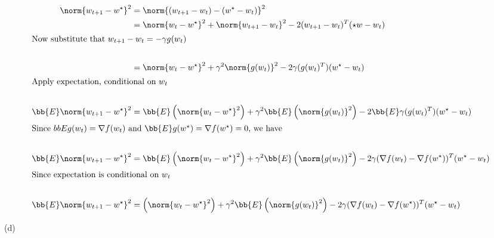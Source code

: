 \documentclass[../main.tex]{subfiles}
\begin{document}
\begin{align*}
    \norm{w_{t+1} - w^{\star}}^2 &= \norm{(w_{t+1} - w_{t}) - (w^{\star} - w_{t})}^2 \\
    &= \norm{w_{t} - w^{\star}}^2 + \norm{w_{t+1} - w_{t}}^2 - 2(w_{t+1}-w_{t})^T(\star{w} - w_{t}) \\
    \intertext{Now substitute that $w_{t+1} - w_{t} = - \gamma g(w_{t})$} \\
    &= \norm{w_{t} - w^{\star}}^2 + \gamma^2\norm{g(w_t)}^2 - 2\gamma(g(w_t)^T)(w^{\star} - w_{t}) \\
    \intertext{Apply expectation, conditional on $w_t$} \\
    \bb{E} \norm{w_{t+1} - w^{\star}}^2 &= \bb{E}\left( \norm{w_{t} - w^{\star}}^2 \right) + \gamma^2 \bb{E}\left( \norm{g(w_t)}^2 \right) - 2 \bb{E}\gamma(g(w_t)^T)(w^{\star} - w_{t}) \\
    \intertext{Since $bb{E}g(w_t) = \nabla f(w_t)$ and $\bb{E}g(w^{\star}) = \nabla f(w^{\star}) = 0$, we have } \\
    \bb{E} \norm{w_{t+1} - w^{\star}}^2 &= \bb{E}\left( \norm{w_{t} - w^{\star}}^2 \right) + \gamma^2 \bb{E}\left( \norm{g(w_t)}^2 \right) - 2\gamma (\nabla f(w_t) - \nabla f(w^{\star}))^T(w^{\star} - w_{t}) \\
    \intertext{Since expectation is conditional on $w_t$} \\
    \bb{E} \norm{w_{t+1} - w^{\star}}^2 &= \left( \norm{w_{t} - w^{\star}}^2 \right) + \gamma^2 \bb{E}\left( \norm{g(w_t)}^2 \right) - 2\gamma (\nabla f(w_t) - \nabla f(w^{\star}))^T(w^{\star} - w_{t}) \\
\end{align*}

(d) \\
\end{document}
